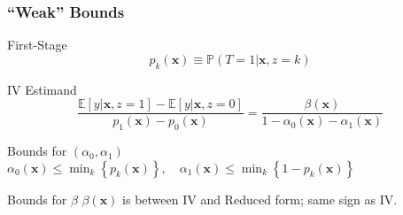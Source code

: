 \documentclass[handout]{beamer}
\begin{document}
\begin{frame}[label=BOUNDS_BODY]
  \frametitle{``Weak'' Bounds}

  \begin{block}{First-Stage}
    \vspace{-2em}
    \[p_k(\mathbf{x}) \equiv  \mathbb{P}(T=1|\mathbf{x},z=k)\]
  \end{block}

  \begin{block}{IV Estimand}
    \vspace{-0.5em}
    \[\displaystyle\frac{\mathbb{E}[y|\mathbf{x},z=1] - \mathbb{E}[y|\mathbf{x},z=0]}{p_1(\mathbf{x}) - p_0(\mathbf{x})} = \frac{\beta(\mathbf{x})}{1 - \alpha_0(\mathbf{x}) - \alpha_1(\mathbf{x})}\]
  \end{block}

  \begin{block}{Bounds for $(\alpha_0, \alpha_1)$}
    $\alpha_0(\mathbf{x}) \leq \min_k \left\{ p_k(\mathbf{x}) \right\}, \quad \alpha_1(\mathbf{x}) \leq \min_k\left\{ 1 - p_k(\mathbf{x}) \right\}$ \hyperlink{BOUNDS_APPEND}{}
  \end{block}


  \begin{alertblock}{Bounds for $\beta$}
    $\beta(\mathbf{x})$ is between IV and Reduced form; same sign as IV. \hyperlink{IV_APPEND}{}
  \end{alertblock}


\end{frame}
\end{document}
